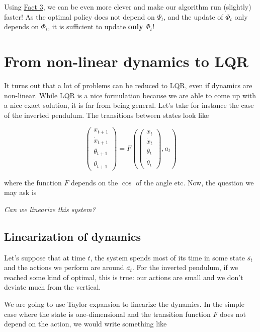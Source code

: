 \documentclass{article}
\begin{document}
Using \underline{Fact 3}, we can be even more clever and make our algorithm run (slightly) faster! As the optimal policy does not depend on $ \Psi_t $, and the update of $ \Phi_t $ only depends on $ \Phi_t $, it is sufficient to update \textbf{only} $ \Phi_t $!

\section{From non-linear dynamics to LQR}

It turns out that a lot of problems can be reduced to LQR, even if dynamics are non-linear. While LQR is a nice formulation because we are able to come up with a nice exact solution, it is far from being general. Let's take for instance the case of the inverted pendulum. The transitions between states look like

\[ \begin{pmatrix}
x_{t+1}\\\dot x_{t+1}\\\theta_{t+1}\\ \dot \theta_{t+1}
\end{pmatrix}  = F \left( \begin{pmatrix}
x_{t}\\\dot x_{t}\\\theta_{t}\\ \dot \theta_{t}
\end{pmatrix}, a_t \right) \]

where the function $ F $ depends on the $ \cos $ of the angle etc. Now, the question we may ask is

\begin{center}
	\textit{Can we linearize this system?}
\end{center}

\subsection{Linearization of dynamics}
Let's suppose that at time $ t $, the system spends most of its time in some state $ \bar{s_t} $ and the actions we perform are around $ \bar{a_t} $. For the inverted pendulum, if we reached some kind of optimal, this is true: our actions are small and we don't deviate much from the vertical. 

We are going to use Taylor expansion to linearize the dynamics. In the simple case where the state is one-dimensional and the transition function $ F $ does not depend on the action, we would write something like
\end{document}
